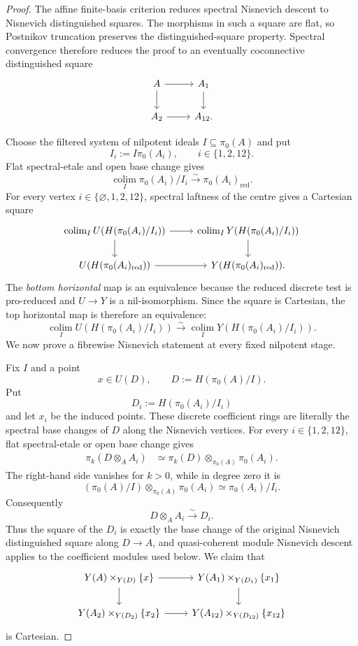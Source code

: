 \begin{proof}
The affine finite-basis criterion reduces spectral Nisnevich descent to
Nisnevich distinguished squares.  The morphisms in such a square are flat, so
Postnikov truncation preserves the distinguished-square property.  Spectral
convergence therefore reduces the proof to an eventually coconnective
distinguished square
\[
\begin{tikzcd}
A \arrow[r] \arrow[d] &
A_1 \arrow[d]\\
A_2 \arrow[r] &
A_{12}.
\end{tikzcd}
\]

Choose the filtered system of nilpotent ideals
$I\subseteq\pi_0(A)$ and put
\[
    I_i:=I\pi_0(A_i),
    \qquad
    i\in\{1,2,12\}.
\]
Flat spectral-etale and open base change gives
\[
    \operatorname*{colim}_I
    \pi_0(A_i)/I_i
    \xrightarrow{\sim}
    \pi_0(A_i)_{\mathrm{red}}.
\]
For every vertex
$i\in\{\varnothing,1,2,12\}$, spectral laftness of the centre gives a
Cartesian square
\[
\begin{tikzcd}
\operatorname*{colim}_I U(H(\pi_0(A_i)/I_i))
    \arrow[r] \arrow[d] &
\operatorname*{colim}_I Y(H(\pi_0(A_i)/I_i))
    \arrow[d]\\
U(H(\pi_0(A_i)_{\mathrm{red}}))
    \arrow[r] &
Y(H(\pi_0(A_i)_{\mathrm{red}})).
\end{tikzcd}
\]
The \emph{bottom horizontal} map is an equivalence because the reduced
discrete test is pro-reduced and $U\to Y$ is a nil-isomorphism.  Since the
square is Cartesian, the top horizontal map is therefore an equivalence:
\[
\boxed{
\operatorname*{colim}_I U(H(\pi_0(A_i)/I_i))
\xrightarrow{\sim}
\operatorname*{colim}_I Y(H(\pi_0(A_i)/I_i)).}
\]
We now prove a fibrewise Nisnevich statement at every fixed nilpotent stage.

Fix $I$ and a point
\[
    x\in U(D),
    \qquad
    D:=H(\pi_0(A)/I).
\]
Put
\[
    D_i:=H(\pi_0(A_i)/I_i)
\]
and let $x_i$ be the induced points.  These discrete coefficient rings are
literally the spectral base changes of $D$ along the Nisnevich vertices.  For
every $i\in\{1,2,12\}$, flat spectral-etale or open base change gives
\[
\begin{aligned}
    \pi_k(D\otimes_AA_i)
    &\simeq
    \pi_k(D)\otimes_{\pi_0(A)}\pi_0(A_i).
\end{aligned}
\]
The right-hand side vanishes for $k>0$, while in degree zero it is
\[
    (\pi_0(A)/I)\otimes_{\pi_0(A)}\pi_0(A_i)
    \simeq
    \pi_0(A_i)/I_i.
\]
Consequently
\[
\boxed{
    D\otimes_AA_i\xrightarrow{\sim}D_i.}
\]
Thus the square of the $D_i$ is exactly the base change of the original
Nisnevich distinguished square along $D\to A$, and quasi-coherent module
Nisnevich descent applies to the coefficient modules used below.  We claim
that
\[
\begin{tikzcd}
Y(A)\times_{Y(D)}\{x\} \arrow[r] \arrow[d] &
Y(A_1)\times_{Y(D_1)}\{x_1\} \arrow[d]\\
Y(A_2)\times_{Y(D_2)}\{x_2\} \arrow[r] &
Y(A_{12})\times_{Y(D_{12})}\{x_{12}\}
\end{tikzcd}
\]
is Cartesian.


\end{proof}
